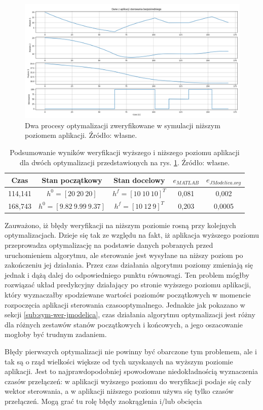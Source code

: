 \begin{figure}
    \centering
    \includegraphics[scale=0.5,angle=90]{Grafika/ext_ctrl_2_opts}
    \caption{Dwa procesy optymalizacji zweryfikowane w symulacji niższym poziomem aplikacji. Źródło: własne.}
    \label{fig:extctrl2opts}
\end{figure}

\begin{table}[htp]
    \centering
    \begin{tabular}{|c|c|c|c|c|}
        \hline 
        \textbf{Czas} & \textbf{Stan początkowy} & \textbf{Stan docelowy} & \textbf{$e_{MATLAB}$} & \textbf{$e_{JModelica.org}$} \\
        \hline 
        114,141 & $h^{0} = [20~ 20~ 20]$ & $h^{f} = [10 ~10~ 10]^{T}$ & 0,081 & 0,002 \\ 
        \hline 
        168,743 & $h^{0} = [9.82~ 9.99~ 9.37]$ & $h^{f} = [10 ~12~ 9]^{T}$ & 0,203 & 0,0005 \\ 
        \hline 
    \end{tabular}
    \caption{Podsumowanie wyników weryfikacji wyższego i niższego poziomu aplikacji dla dwóch optymalizacji przedstawionych na rys. \ref{fig:extctrl2opts}. Źródło: własne.}
    \label{tab:extctrl2opts}
\end{table}

Zauważono, iż błędy weryfikacji na niższym poziomie rosną przy kolejnych optymalizacjach. Dzieje się tak ze względu na fakt, iż aplikacja wyższego poziomu przeprowadza optymalizację na podstawie danych pobranych przed uruchomieniem algorytmu, ale sterowanie jest wysyłane na niższy poziom po zakończeniu jej działania. Przez czas działania algorytmu poziomy zmieniają się jednak i dążą dalej do odpowiedniego punktu równowagi. Ten problem mógłby rozwiązać układ predykcyjny działający po stronie wyższego poziomu aplikacji, który wyznaczałby spodziewane wartości poziomów początkowych w momencie rozpoczęcia aplikacji sterowania czasooptymalnego. Jednakże jak pokazano w sekcji \ref{sub:sym-wer-jmodelica}, czas działania algorytmu optymalizacji jest różny dla różnych zestawów stanów początkowych i końcowych, a jego oszacowanie mogłoby być trudnym zadaniem.

Błędy pierwszych optymalizacji nie powinny być obarczone tym problemem, ale i tak są o rząd wielkości większe od tych uzyskanych na wyższym poziomie aplikacji. Jest to najprawdopodobniej spowodowane niedokładnością wyznaczenia czasów przełączeń: w aplikacji wyższego poziomu do weryfikacji podaje się cały wektor sterowania, a w aplikacji niższego poziomu używa się tylko czasów przełączeń. Mogą grać tu rolę błędy zaokrąglenia i/lub obcięcia
